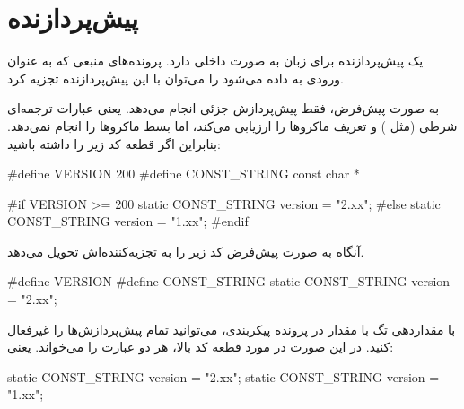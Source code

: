 %
% 
% 
% 
%
\chapter{پیش‌پردازنده}

یک پیش‌پردازنده برای زبان  به صورت داخلی دارد. پرونده‌های منبعی که به
عنوان ورودی به  داده می‌شود را می‌توان با این پیش‌پردازنده تجزیه
کرد.

به صورت پیش‌فرض،  فقط پیش‌پردازش جزئی انجام می‌دهد. یعنی عبارات
ترجمه‌ای شرطی (مثل ) و تعریف ماکروها را ارزیابی می‌کند، اما بسط ماکروها
را انجام نمی‌دهد. بنابراین اگر قطعه کد زیر را داشته باشید:
\begin{C++}
#define VERSION 200
#define CONST_STRING const char *

#if VERSION >= 200
  static CONST_STRING version = "2.xx";
#else
  static CONST_STRING version = "1.xx";
#endif
\end{C++}

آنگاه  به صورت پیش‌فرض کد زیر را به تجزیه‌کننده‌اش تحویل می‌دهد.
\begin{C++}
#define VERSION
#define CONST_STRING
static CONST_STRING version = "2.xx";
\end{C++}

با مقداردهی تگ  با مقدار  در پرونده پیکربندی،
می‌توانید تمام پیش‌پردازش‌ها را غیرفعال کنید. در این صورت در مورد قطعه کد بالا،
 هر دو عبارت را می‌خواند. یعنی:
\begin{C++}
static CONST_STRING version = "2.xx";
static CONST_STRING version = "1.xx";
\end{C++}

